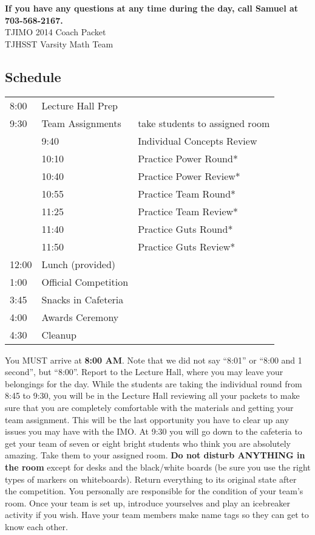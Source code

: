 \documentclass[11pt]{article}
\begin{document}
\begin{center}
\small{\textbf{If you have any questions at any time during the day, call Samuel at 703-568-2167.}} \\
\LARGE{TJIMO 2014 Coach Packet} \\
\large{TJHSST Varsity Math Team} \\
\end{center}

\begin{small}
\section{Schedule}
\begin{tabular}{l l l }
  8:00 & Lecture Hall Prep & \\
  9:30 & Team Assignments & take students to assigned room \\
  & 9:40 & Individual Concepts Review \\
  & 10:10 & Practice Power Round* \\
  & 10:40 & Practice Power Review* \\
  & 10:55 & Practice Team Round* \\
  & 11:25 & Practice Team Review* \\
  & 11:40 & Practice Guts Round* \\
  & 11:50 & Practice Guts Review* \\
 12:00 & Lunch (provided) \\
  1:00 & Official Competition \\
  3:45 & Snacks in Cafeteria \\
  4:00 & Awards Ceremony \\
  4:30 & Cleanup \\
\end{tabular}

\vspace{0.5cm}

\noindent You MUST arrive at \textbf{8:00 AM}. Note that we did not say ``8:01'' or ``8:00 and 1 second'', but ``8:00''.  Report to the Lecture Hall, where you may leave your belongings for the day.  While the students are taking the individual round from 8:45 to 9:30, you will be in the Lecture Hall reviewing all your packets to make sure that you are completely comfortable with the materials and getting your team assignment. This will be the last opportunity you have to clear up any issues you may have with the IMO. At 9:30 you will go down to the cafeteria to get your team of seven or eight bright students who think you are absolutely amazing.  Take them to your assigned room. \textbf{Do not disturb ANYTHING in the room} except for desks and the black/white boards (be sure you use the right types of markers on whiteboards).  Return everything to its original state after the competition. You personally are responsible for the condition of your team's room.  Once your team is set up, introduce yourselves and play an icebreaker activity if you wish. Have your team members make name tags so they can get to know each other. \\


\end{small}
\end{document}
